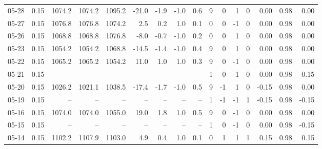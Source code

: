 \begin{threeparttable}
{\begin{tabular}{lrrrrrrrrrrrrrrr}
  05-28 &     0.15 & 1074.2 & 1074.2 & 1095.2 &      -21.0 &           -1.9 &                     -1.0 &                 0.6 &              9 &         0 &     1 &         0 &       0.00 &      0.98 &           0.00 \\
  05-27 &     0.15 & 1076.8 & 1076.8 & 1074.2 &        2.5 &            0.2 &                      1.0 &                 0.1 &              0 &         0 &    -1 &         0 &       0.00 &      0.98 &           0.00 \\
  05-26 &     0.15 & 1068.8 & 1068.8 & 1076.8 &       -8.0 &           -0.7 &                     -1.0 &                 0.2 &              0 &         0 &     1 &         0 &       0.00 &      0.98 &           0.00 \\
  05-23 &     0.15 & 1054.2 & 1054.2 & 1068.8 &      -14.5 &           -1.4 &                     -1.0 &                 0.4 &              9 &         0 &     1 &         0 &       0.00 &      0.98 &           0.00 \\
  05-22 &     0.15 & 1065.2 & 1065.2 & 1054.2 &       11.0 &            1.0 &                      1.0 &                 0.3 &              9 &         0 &    -1 &         0 &       0.00 &      0.98 &           0.00 \\
  05-21 &     0.15 &     -- &     -- &     -- &         -- &             -- &                       -- &                  -- &              1 &         0 &     1 &         0 &       0.00 &      0.98 &           0.15 \\
  05-20 &     0.15 & 1026.2 & 1021.1 & 1038.5 &      -17.4 &           -1.7 &                     -1.0 &                 0.5 &              9 &        -1 &     1 &         0 &      -0.15 &      0.98 &           0.00 \\
  05-19 &     0.15 &     -- &     -- &     -- &         -- &             -- &                       -- &                  -- &              1 &        -1 &    -1 &         1 &      -0.15 &      0.98 &          -0.15 \\
  05-16 &     0.15 & 1074.0 & 1074.0 & 1055.0 &       19.0 &            1.8 &                      1.0 &                 0.5 &              9 &         0 &    -1 &         0 &       0.00 &      0.98 &           0.00 \\
  05-15 &     0.15 &     -- &     -- &     -- &         -- &             -- &                       -- &                  -- &              1 &         0 &    -1 &         0 &       0.00 &      0.98 &          -0.15 \\
  05-14 &     0.15 & 1102.2 & 1107.9 & 1103.0 &        4.9 &            0.4 &                      1.0 &                 0.1 &              0 &         1 &     1 &         1 &       0.15 &      0.98 &           0.15 \\

\end{tabular}}
\end{threeparttable}
